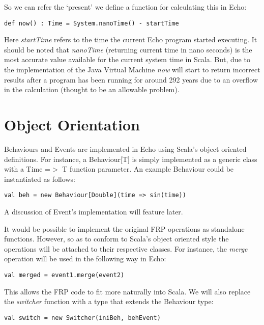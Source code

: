     So we can refer the `present' we define a function for calculating this in Echo:
    
\begin{verbatim}
def now() : Time = System.nanoTime() - startTime
\end{verbatim}      

    Here \emph{startTime} refers to the time the current Echo program started executing. It should be noted that \emph{nanoTime} (returning current time in
    nano seconds) is the most accurate value available for the current system time in Scala. But, due to the
    implementation of the Java Virtual Machine \emph{now} will start to return incorrect results 
    after a program has been running for around 292 years due to an overflow in the calculation (thought to be an allowable
    problem).
    
  \section{Object Orientation}
    Behaviours and Events are implemented in
    Echo using Scala's object oriented definitions. For instance, a Behaviour[T] is simply
    implemented as a generic class with a Time =$>$ T function parameter. An example Behaviour
    could be instantiated as follows:

\begin{verbatim}
val beh = new Behaviour[Double](time => sin(time))
\end{verbatim}  

    A discussion of Event's implementation will feature later.
    
    It would be possible to implement the original FRP operations as standalone functions. However, so
    as to conform to Scala's object oriented style the operations will be attached to their respective
    classes. For instance, the \emph{merge} operation will be used in the following way in Echo:
    
\begin{verbatim}
val merged = event1.merge(event2)
\end{verbatim}

  This allows the FRP code to fit more naturally into Scala. We will also replace the \emph{switcher} function
  with a type that extends the Behaviour type:
  
\begin{verbatim}
val switch = new Switcher(iniBeh, behEvent)
\end{verbatim}

